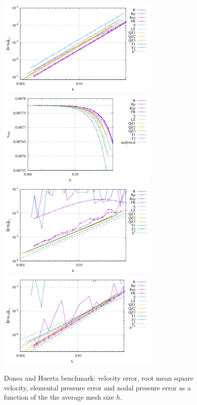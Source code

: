 \documentclass[a4paper]{article}
\begin{document}
\begin{figure}
\centering
\includegraphics[width=8cm]{../results/errors_u_exp1}
\includegraphics[width=8cm]{../results/vrms_exp1} \\
\includegraphics[width=8cm]{../results/errors_p_exp1}
\includegraphics[width=8cm]{../results/errors_q1_exp1}
\caption{Donea and Huerta benchmark: velocity error, 
root mean square velocity, elemental pressure error and nodal pressure error
as a function of the the average mesh size $h$.} 
\label{fig:resdh}
\end{figure}
\end{document}
